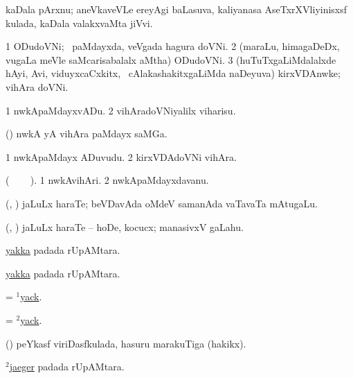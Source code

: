  kaDala pArxnu; aneVkaveVLe ereyAgi baLasuva, kaliyanasa AseTxrXVliyinisxsf kulada, kaDala valakxvaMta jiVvi.
\eanum
\emng
\eentry

\bentry
{} 
\gl{\nA} 
\bmng
\bnum
\num{1} ODudoVNi; \kanmu\ paMdayxda, veVgada hagura  doVNi. 
\num{2} (maraLu, himagaDeDx, \mo vugaLa meVle saMcarisabalalx aMtha) ODudoVNi. 
\num{3} (huTuTxgaLiMdalalxde hAyi, Avi, viduyxcaCxkitx, \mo\ cAlakashakitxgaLiMda naDeyuva) kirxVDAnwke; vihAra doVNi.
\enum
\emng
\eentry

\bentry
{} 
\gl{\akirx} 
\bmng
\bnum
\num{1} nwkApaMdayxvADu. 
\num{2}  vihAradoVNiyalilx viharisu.
\enum
\emng
\eentry

\bentry 
{} 
\gl{\nA}
\bmng
(\kanmu) nwkA yA vihAra paMdayx saMGa.
\emng
\eentry

\bentry
{} 
\gl{\nA} 
\bmng
\bnum
\num{1} nwkApaMdayx ADuvudu. 
\num{2} kirxVDAdoVNi vihAra.
\enum
\emng
\eentry

\bentry
{} 
\gl{\nA} 
\bmng
(\bava\   \sitxrXV\   \bava\ ).
\bnum
\num{1} nwkAvihAri. 
\num{2} nwkApaMdayxdavanu.
\enum
\emng
\eentry

\bentry
{} 
\gl{\nA}  
\bmng
(\ashi, \hiV) jaLuLx haraTe; beVDavAda oMdeV samanAda vaTavaTa mAtugaLu.
\emng
\eentry

\bentry
{} 
\gl{\akirx} 
\bmng
(\ashi, \hiV) jaLuLx haraTe -- hoDe, kocucx; manasivxV gaLahu.
\emng
\eentry

\bentry
{} 
\gl{\nA}
\bmng
\hyperlink{yakka}{yakka} padada rUpAMtara.
\emng
\eentry

\bentry
{} 
\gl{\nA} 
\bmng
\hyperlink{yakka}{yakka} padada rUpAMtara.
\emng
\eentry

\bentry
{} 
\gl{\nA}
\bmng
= \hyperlink{yack(1)}{$^1$yack}.
\emng
\eentry

\bentry
{} 
\gl{\akirx} 
\bmng
= \hyperlink{yack(2)}{$^2$yack}.
\emng
\eentry

\bentry
{} 
\gl{\nA}
\bmng
(\pArxM) peYkasf viriDasfkulada, hasuru marakuTiga (hakikx).
\emng
\eentry

\bentry
{} 
\gl{\nA}
\bmng
\hyperref{kandict_j.pdf}{J}{jaeger(2)}{$^2$jaeger} padada rUpAMtara. 
\emng
\eentry

